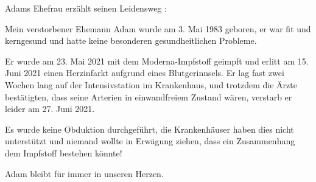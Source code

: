 Adams Ehefrau erzählt seinen Leidensweg :

Mein verstorbener Ehemann Adam wurde am 3. Mai 1983 geboren, er war fit und
kerngesund und hatte keine besonderen gesundheitlichen Probleme.

Er wurde am 23. Mai 2021 mit dem Moderna-Impfstoff geimpft und erlitt am
15. Juni 2021 einen Herzinfarkt aufgrund eines Blutgerinnsels. Er lag fast zwei
Wochen lang auf der Intensivstation im Krankenhaus, und trotzdem die Ärzte
bestätigten, dass seine Arterien in einwandfreiem Zustand wären, verstarb er
leider am 27. Juni 2021.

Es wurde keine Obduktion durchgeführt, die Krankenhäuser haben dies nicht
unterstützt und niemand wollte in Erwägung ziehen, dass ein Zusammenhang dem
Impfstoff bestehen könnte!

Adam bleibt für immer in unseren Herzen.
